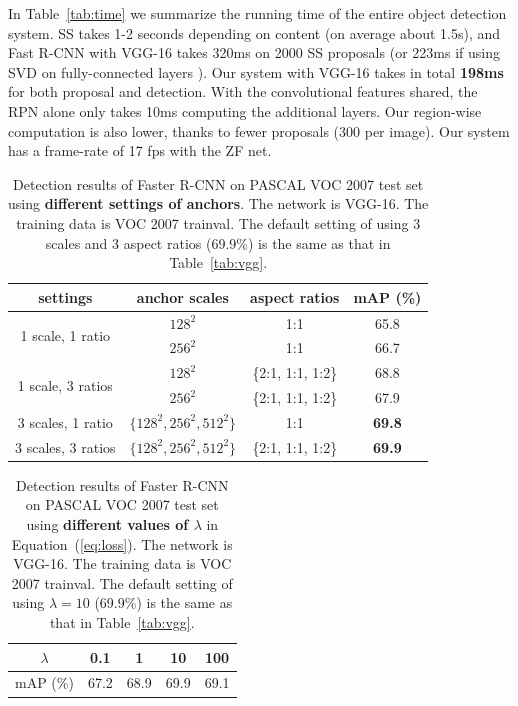\documentclass[10pt,journal,cspaper,compsoc]{IEEEtran}
\begin{document}
In Table~\ref{tab:time} we summarize the running time of the entire object detection system. SS takes 1-2 seconds depending on content (on average about 1.5s), and Fast R-CNN with VGG-16 takes 320ms on 2000 SS proposals (or 223ms if using SVD on fully-connected layers \cite{Girshick2015a}). Our system with VGG-16 takes in total \textbf{198ms} for both proposal and detection. With the convolutional features shared, the RPN alone only takes 10ms computing the additional layers.
Our region-wise computation is also lower, thanks to fewer proposals (300 per image). Our system has a frame-rate of 17 fps with the ZF net.

\setlength{\tabcolsep}{2pt}
\renewcommand{\arraystretch}{1.1}
\begin{table}[t]
\begin{center}
\caption{Detection results of Faster R-CNN on PASCAL VOC 2007 test set using \textbf{different settings of anchors}. The network is VGG-16. The training data is VOC 2007 trainval. The default setting of using 3 scales and 3 aspect ratios (69.9\%) is the same as that in Table~\ref{tab:vgg}.}
\vspace{-1em}
\small
\begin{tabular}{c|c|c|c}
settings &  anchor scales & aspect ratios & mAP (\%)\\
\hline
\hline
\multirow{2}{*}{1 scale, 1 ratio} & \footnotesize $128^2$ & 1:1 & 65.8 \\
                                  & \footnotesize $256^2$ & 1:1 & 66.7 \\
\hline
\multirow{2}{*}{1 scale, 3 ratios} & \footnotesize $128^2$ & \{2:1, 1:1, 1:2\} & 68.8 \\
                                   & \footnotesize $256^2$ & \{2:1, 1:1, 1:2\} & 67.9 \\
\hline
\multirow{1}{*}{3 scales, 1 ratio} & \footnotesize $\{128^2, 256^2, 512^2\}$ & 1:1 & \textbf{69.8} \\
\hline
\multirow{1}{*}{3 scales, 3 ratios} &  \footnotesize $\{128^2, 256^2, 512^2\}$ & \{2:1, 1:1, 1:2\} & \textbf{69.9} \\
\end{tabular}
\label{tab:anchors}
\end{center}
\end{table}

\setlength{\tabcolsep}{10pt}
\begin{table}[t]
\begin{center}
\caption{Detection results of Faster R-CNN on PASCAL VOC 2007 test set using \textbf{different values of $\lambda$} in Equation~(\ref{eq:loss}). The network is VGG-16. The training data is VOC 2007 trainval. The default setting of using $\lambda=10$ (69.9\%) is the same as that in Table~\ref{tab:vgg}.}
\vspace{-1em}
\small
\begin{tabular}{c|cccc}
$\lambda$ & 0.1 & 1 & 10 & 100\\
\hline
mAP (\%) & 67.2 & 68.9 & 69.9 & 69.1\\
\end{tabular}
\label{tab:lambda}
\end{center}
\end{table}
\end{document}
